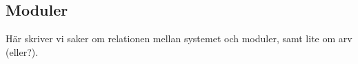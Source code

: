 \subsection{Moduler}
Här skriver vi saker om relationen mellan systemet och moduler, samt lite om arv
(eller?).
